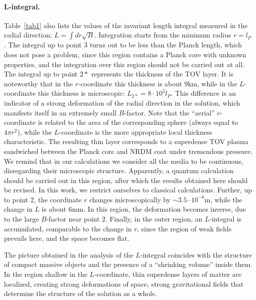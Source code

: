 \documentclass{article}
\begin{document}
\paragraph* {L-integral.} Table~\ref {tab1} also lists the values of the invariant length integral measured in the radial direction: $ L = \int dr \sqrt {B} $. Integration starts from the minimum radius $ r = l_P $. The integral up to point 3 turns out to be less than the Planck length, which does not pose a problem, since this region contains a Planck core with unknown properties, and the integration over this region should not be carried out at all. The integral up to point $ 2 * $ represents the thickness of the TOV layer. It is noteworthy that in the $ r $-coordinate this thickness is about 9km, while in the $ L $-coordinate this thickness is microscopic: $ L_ {2 *} = 8 \cdot10 ^ 5l_P $. This difference is an indicator of a strong deformation of the radial direction in the solution, which manifests itself in an extremely small $ B $-factor. Note that the ``aerial'' $ r $-coordinate is related to the area of the corresponding sphere (always equal to $ 4 \pi r ^ 2 $), while the $ L $-coordinate is the more appropriate local thickness characteristic. The resulting thin layer corresponds to a superdense TOV plasma sandwiched between the Planck core and NRDM coat under tremendous pressure. We remind that in our calculations we consider all the media to be continuous, disregarding their microscopic structure. Apparently, a quantum calculation should be carried out in this region, after which the results obtained here should be revised. In this work, we restrict ourselves to classical calculations. Further, up to point 2, the coordinate $ r $ changes microscopically by $ \sim3.5 \cdot10 ^ {- 8} $m, while the change in $ L $ is about 6mm. In this region, the deformation becomes inverse, due to the large $ B $-factor near point 2. Finally, in the outer region, an $ L $-integral is accumulated, comparable to the change in $ r $, since the region of weak fields prevails here, and the space becomes flat.

The picture obtained in the analysis of the $ L $-integral coincides with the structure of compact massive objects and the presence of a ``shrinking volume'' \cite {1612.04889} inside them. In the region shallow in the $ L $-coordinate, thin superdense layers of matter are localized, creating strong deformations of space, strong gravitational fields that determine the structure of the solution as a whole.
\end{document}
